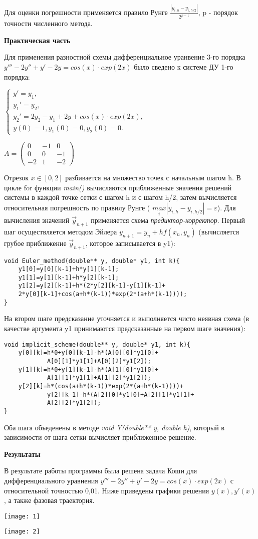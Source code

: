 \documentclass{article}
\begin{document}
Для оценки погрешности применяется правило Рунге \(\frac{|y_{i,h}-y_{i,h/2}|}{2^{p-1}}\), p - порядок точности численного метода.

\LARGE
\textbf{Практическая часть}

\Large
Для применения разностной схемы дифференциальное уранвение 3-го порядка \( y'''-2y''+y'-2y=cos(x)\cdot exp(2x)\) было сведено к системе ДУ 1-го порядка: 

\(\begin{cases}
 y'=y_{1}, \\ 
 y_{1}'=y_{2},\\ 
 y_{2}'=2y_{2}-y_{1}+2y+cos(x)\cdot exp(2x),\\
 y(0)=1,y_{1}(0)=0,y_{2}(0)=0.
\end{cases}\)

\(A=\begin{pmatrix}
0 & -1 & 0 \\ 
0 & 0 & -1\\ 
-2 & 1 & -2
\end{pmatrix}\)

Отрезок \(x\in [0,2]\) разбивается на множество точек с начальным шагом h.
В цикле for функции \textit{main()} вычисляются приближенные значения решений системы в каждой точке сетки с шагом h и с шагом h/2, затем вычисляется относительная погрешность по правилу Рунге ( \(\underset{i}{max}|y_{i,h}-y_{i,h/2}|=\varepsilon\)). Для вычисления значений \(\vec{y}_{n+1}\) применяется схема \textit{предиктор-корректор}. Первый шаг осуществляется методом Эйлера \(y_{n+1}=y_{n}+hf(x_{n},y_{n})\) (вычисляется грубое приближение \(\vec{y}_{n+1}\), которое записывается в y1): 
\begin{verbatim}
void Euler_method(double** y, double* y1, int k){
	y1[0]=y[0][k-1]+h*y[1][k-1];
	y1[1]=y[1][k-1]+h*y[2][k-1];
	y1[2]=y[2][k-1]+h*(2*y[2][k-1]-y[1][k-1]+
	2*y[0][k-1]+cos(a+h*(k-1))*exp(2*(a+h*(k-1))));
}
\end{verbatim}
На втором шаге предсказание уточняется и выполняется чисто неявная схема (в качестве аргумента y1 принимаются предсказанные на первом шаге значения):
\begin{verbatim}
void implicit_scheme(double** y, double* y1, int k){
	y[0][k]=h*0+y[0][k-1]-h*(A[0][0]*y1[0]+
	        A[0][1]*y1[1]+A[0][2]*y1[2]);
	y[1][k]=h*0+y[1][k-1]-h*(A[1][0]*y1[0]+
	        A[1][1]*y1[1]+A[1][2]*y1[2]);
	y[2][k]=h*(cos(a+h*(k-1))*exp(2*(a+h*(k-1))))+
	        y[2][k-1]-h*(A[2][0]*y1[0]+A[2][1]*y1[1]+
	        A[2][2]*y1[2]);
}
\end{verbatim}
Оба шага объеденены в методе \textit{void Y(double** y, double h)}, который в зависимости от шага сетки вычисляет приближенное решение.

\LARGE
\textbf{Результаты}

\Large
В результате работы программы была решена задача Коши для дифференциального уравнения \( y'''-2y''+y'-2y=cos(x)\cdot exp(2x)\) с относительной точностью 0,01. Ниже приведены графики решения \(y(x),y'(x)\), а также фазовая траектория.

\texttt{[image: 1]}

\texttt{[image: 2]}
\end{document}
